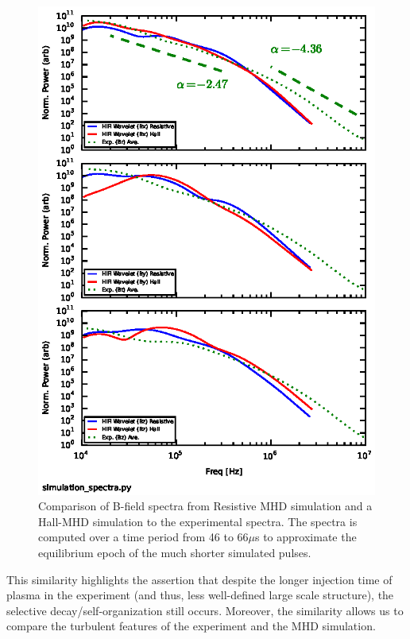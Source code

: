 \documentclass[12pt]{iopart}
\begin{document}
\begin{figure}[!htbp]
\centerline{
\includegraphics[width=12cm]{simBspectra.eps}}
\caption{\label{fig:simBspectra} Comparison of B-field spectra from Resistive MHD simulation and a Hall-MHD simulation to the experimental spectra. The spectra is computed over a time period from 46 to 66$\mu$s to approximate the equilibrium epoch of the much shorter simulated pulses.}
\end{figure}

This similarity highlights the assertion that despite the longer injection time of plasma in the experiment (and thus, less well-defined large scale structure), the selective decay/self-organization still occurs. Moreover, the similarity allows us to compare the turbulent features of the experiment and the MHD simulation.
\end{document}
